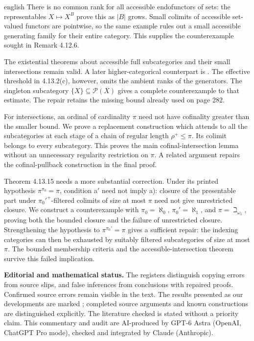 \begin{otherlanguage*}{english}
There is no common rank for all accessible endofunctors of sets: the representables $X\mapsto X^B$ prove this as $|B|$ grows. Small colimits of accessible set-valued functors are pointwise, so the same example rules out a small accessible generating family for their entire category. This supplies the counterexample sought in Remark 4.12.6.

The existential theorems about accessible full subcategories and their small intersections remain valid. A later higher-categorical counterpart is \citet[Proposition 5.4.7.10]{Lurie2009HTT}. The effective threshold in 4.13.2(c), however, omits the ambient ranks of the generators. The singleton subcategory $\{X\}\subseteq\mathcal P(X)$ gives a complete counterexample to that estimate. The repair retains the missing bound already used on page 282.

For intersections, an ordinal of cardinality $\pi$ need not have cofinality greater than the smaller bound. We prove a replacement construction which attends to all the subcategories at each stage of a chain of regular length $\rho^+\leq\pi$. Its colimit belongs to every subcategory. This proves the main cofinal-intersection lemma without an unnecessary regularity restriction on $\pi$. A related argument repairs the cofinal-pullback construction in the final proof.

Theorem 4.13.15 needs a more substantial correction. Under its printed hypothesis $\pi^{\pi_0}=\pi$, condition a$'$ need not imply a): closure of the presentable part under $\pi_0'^+$-filtered colimits of size at most $\pi$ need not give unrestricted closure. We construct a counterexample with $\pi_0=\aleph_0$, $\pi_0'=\aleph_1$, and $\pi=\beth_{\omega_1}$, proving both the bounded closure and the failure of unrestricted closure. Strengthening the hypothesis to $\pi^{\pi_0'}=\pi$ gives a sufficient repair: the indexing categories can then be exhausted by suitably filtered subcategories of size at most $\pi$. The bounded membership criteria and the accessible-intersection theorem survive this failed implication.

\medskip\noindent\textbf{Editorial and mathematical status.}
The registers distinguish copying errors from source slips, and false inferences from conclusions with repaired proofs. Confirmed source errors remain visible in the text. The results presented as our developments are marked \ours; completed source arguments and known constructions are distinguished explicitly. The literature checked is stated without a priority claim. This commentary and audit are AI-produced by GPT-6 Astra (OpenAI, ChatGPT Pro mode), checked and integrated by Claude (Anthropic).
\end{otherlanguage*}
